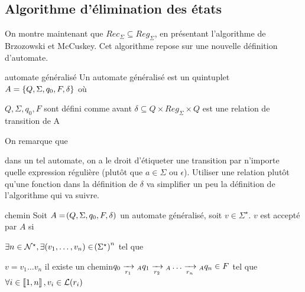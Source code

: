 \documentclass[a4paper,french,bookmarks]{book}
\begin{document}
    \subsection{Algorithme d'élimination des états}
    
    On montre maintenant que $Rec_\Sigma \subseteq Reg_\Sigma$, en présentant l'algorithme de Brzozowski et McCuskey. Cet algorithme repose sur une nouvelle définition d'automate.
    
    \begin{definition}{automate généralisé}{}
        Un automate généralisé est un quintuplet $A = \left\{Q, \Sigma, q_0, F, \delta\right\}$ où
        \begin{enumerate}
            \itt $Q, \Sigma, q_0, F$ sont défini comme avant
            \itt $\delta \subseteq Q \times Reg_\Sigma \times Q$ est une relation de transition de A
        \end{enumerate}
    
    \end{definition}
    On remarque que
    \begin{enumerate}
        \itt  dans un tel automate, on a le droit d'étiqueter une transition par n'importe quelle expression régulière (plutôt que $a \in \Sigma$ ou $\epsilon$).
        \itt Utiliser une relation plutôt qu'une fonction dans la définition de $\delta$ va simplifier un peu la définition de l'algorithme qui va suivre.
    \end{enumerate}

    \begin{definition}{chemin}{}
        Soit $A = \!\left(Q, \Sigma, q_0, F, \delta\right)$ un automate généralisé, soit $v \in \Sigma^\star$. $v$ est accepté par $A$ si
        \begin{enumerate}
            \itt $\exists n \in \mathcal{N}^\star, \exists \!\left(v_1, \dots, v_n\right) \in \!\left(\Sigma^\star\right)^n$ tel que
            \begin{enumerate}
                \itt $v = v_1 \dots v_n$
                \itt il existe un chemin$q_0 \lima{r_1}{}_A q_1 \lima{r_2}{}_A \dots \lima{r_n}{}_A q_n \in F$ tel que $\forall i \in \left\llbracket1, n\right\rrbracket, v_i \in \mathcal{L}\!\left(r_i\right)$
            \end{enumerate}
        \end{enumerate}
        
    \end{definition}
    
\end{document}
